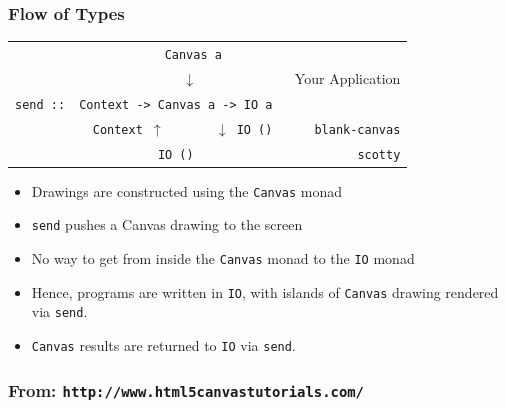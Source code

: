 \documentclass{beamer}
\begin{document}
\begin{frame}[fragile]
\frametitle{Flow of Types}

\large
\begin{tabular}{rcrr}
        & \multicolumn{2}{c}{~~~~~{\tt Canvas a}}\\
        & \multicolumn{2}{c}{~~~~$\downarrow$}                    & Your Application\\
{\tt send ::}& \multicolumn{2}{c}{{\tt Context -> Canvas a -> IO a}}\\
        \cline{2-3}\noalign{\smallskip}
        & {\tt Context}~$\uparrow$      & $\downarrow$~{\tt IO~()}    & ~~~~{\tt  blank-canvas}\\
        \cline{2-3}\noalign{\smallskip}
        & \multicolumn{2}{c}{\tt IO ()}                                   & {\tt scotty}\\
\end{tabular}

\frameskip
\frameskip
\frameskip

\begin{itemize}
\item Drawings are constructed using the {\tt Canvas} monad
\item {\tt send} pushes a Canvas drawing to the screen
\item No way to get from inside the {\tt Canvas} monad
to the {\tt IO} monad
\item Hence, programs are written in {\tt IO}, with
islands of {\tt Canvas} drawing rendered via {\tt send}.
\item {\tt Canvas} results are returned to {\tt IO} via {\tt send}.
\end{itemize}        

\end{frame}



\begin{frame}[fragile]
\frametitle{From: {\tt http://www.html5canvastutorials.com/}}

\begin{codeblock}[0.8]
\tiny
{}
\end{codeblock}
\end{frame}
\end{document}
